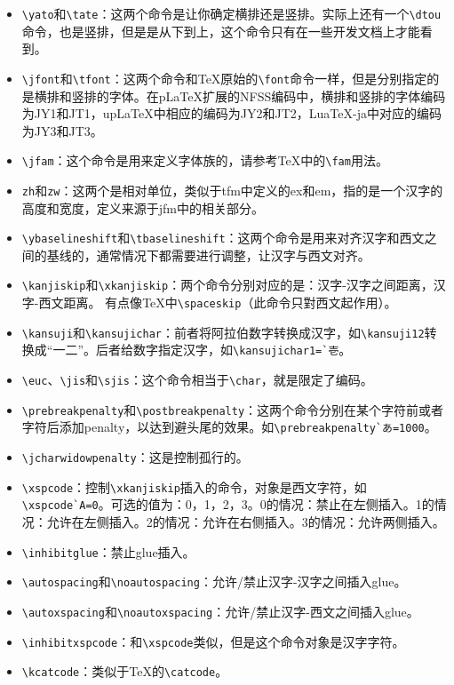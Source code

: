 \begin{appendix}
\begin{itemize}
\item{}{\verb+\yato+}和{\verb+\tate+}：这两个命令是让你确定横排还是竖排。实际上还有一个{\verb+\dtou+}命令，也是竖排，但是是从下到上，这个命令只有在一些开发文档上才能看到。
\item{}{\verb+\jfont+}和{\verb+\tfont+}：这两个命令和TeX原始的{\verb+\font+}命令一样，但是分别指定的是横排和竖排的字体。在{p\LaTeX}扩展的NFSS编码中，横排和竖排的字体编码为JY1和JT1，{up\LaTeX}中相应的编码为JY2和JT2，{Lua\TeX}-ja中对应的编码为JY3和JT3。
\item{}{\verb+\jfam+}：这个命令是用来定义字体族的，请参考{\TeX}中的{\verb+\fam+}用法。
\item{}{\verb+zh+}和{\verb+zw+}：这两个是相对单位，类似于tfm中定义的ex和em，指的是一个汉字的高度和宽度，定义来源于jfm中的相关部分。
\item{}{\verb+\ybaselineshift+}和{\verb+\tbaselineshift+}：这两个命令是用来对齐汉字和西文之间的基线的，通常情况下都需要进行调整，让汉字与西文对齐。
\item{}{\verb+\kanjiskip+}和{\verb+\xkanjiskip+}：两个命令分别对应的是：汉字-汉字之间距离，汉字-西文距离。 有点像{\TeX}中{\verb+\spaceskip+}（此命令只對西文起作用）。
\item{}{\verb+\kansuji+}和{\verb+\kansujichar+}：前者将阿拉伯数字转换成汉字，如{\verb+\kansuji12+}转换成“一二”。后者给数字指定汉字，如{\verb+\kansujichar1=`壱+}。
\item{}{\verb+\euc+}、{\verb+\jis+}和{\verb+\sjis+}：这个命令相当于{\verb+\char+}，就是限定了编码。
\item{}{\verb+\prebreakpenalty+}和{\verb+\postbreakpenalty+}：这两个命令分别在某个字符前或者字符后添加penalty，以达到避头尾的效果。如{\verb+\prebreakpenalty`あ=1000+}。
\item{}{\verb+\jcharwidowpenalty+}：这是控制孤行的。
\item{}{\verb+\xspcode+}：控制{\verb+\xkanjiskip+}插入的命令，对象是西文字符，如{\verb+\xspcode`A=0+}。可选的值为：0，1，2，3。0的情况：禁止在左侧插入。1的情况：允许在左侧插入。2的情况：允许在右侧插入。3的情况：允许两侧插入。
\item{}{\verb+\inhibitglue+}：禁止glue插入。
\item{}{\verb+\autospacing+}和{\verb+\noautospacing+}：允许/禁止汉字-汉字之间插入glue。
\item{}{\verb+\autoxspacing+}和{\verb+\noautoxspacing+}：允许/禁止汉字-西文之间插入glue。
\item{}{\verb+\inhibitxspcode+}：和{\verb+\xspcode+}类似，但是这个命令对象是汉字字符。
\item{}{\verb+\kcatcode+}：类似于TeX的{\verb+\catcode+}。
\end{itemize}


\end{appendix}
